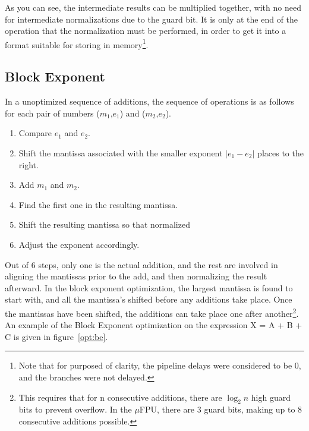 %

As you can see, the intermediate results can be multiplied together, with no
need for intermediate normalizations due to the guard bit.  It is only at
the end of the operation that the normalization must be performed, in order
to get it into a format suitable for storing in memory\footnote{Note that
for purposed of clarity, the pipeline delays were considered to be 0, and
the branches were not delayed.}.

\subsection{Block Exponent}

In a unoptimized sequence of additions, the sequence of operations is as
follows for each pair of numbers ($m_1$,$e_1$) and ($m_2$,$e_2$).
\begin{enumerate}
  \item Compare $e_1$ and $e_2$.
  \item Shift the mantissa associated with the smaller exponent $|e_1-e_2|$
        places to the right.
  \item Add $m_1$ and $m_2$.
  \item Find the first one in the resulting mantissa.
  \item Shift the resulting mantissa so that normalized
  \item Adjust the exponent accordingly.
\end{enumerate}

Out of 6 steps, only one is the actual addition, and the rest are involved
in aligning the mantissas prior to the add, and then normalizing the result
afterward.  In the block exponent optimization, the largest mantissa is
found to start with, and all the mantissa's shifted before any additions
take place.  Once the mantissas have been shifted, the additions can take
place one after another\footnote{This requires that for n consecutive
additions, there are $\log_{2}n$ high guard bits to prevent overflow.  In
the $\mu$FPU, there are 3 guard bits, making up to 8 consecutive additions
possible.}.  An example of the Block Exponent optimization on the expression
X = A + B + C is given in figure~\ref{opt:be}.

